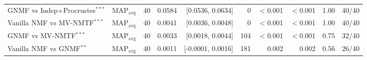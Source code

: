 \begin{table}[t]
\begin{tabular}{llcrrrrrrl}
GNMF vs Indep+Procrustes$^{***}$ & MAP$_{\text{avg}}$ & 40 & 0.0584 & [0.0536, 0.0634] & 0 & $<$0.001 & $<$0.001 & 1.00 & 40/40 \\
Vanilla NMF vs MV-NMTF$^{***}$ & MAP$_{\text{avg}}$ & 40 & 0.0041 & [0.0036, 0.0048] & 0 & $<$0.001 & $<$0.001 & 1.00 & 40/40 \\
GNMF vs MV-NMTF$^{***}$ & MAP$_{\text{avg}}$ & 40 & 0.0033 & [0.0018, 0.0044] & 104 & $<$0.001 & $<$0.001 & 0.75 & 32/40 \\
Vanilla NMF vs GNMF$^{**}$ & MAP$_{\text{avg}}$ & 40 & 0.0011 & [-0.0001, 0.0016] & 181 & 0.002 & 0.002 & 0.56 & 26/40 \\
\bottomrule
\end{tabular}
\end{table}